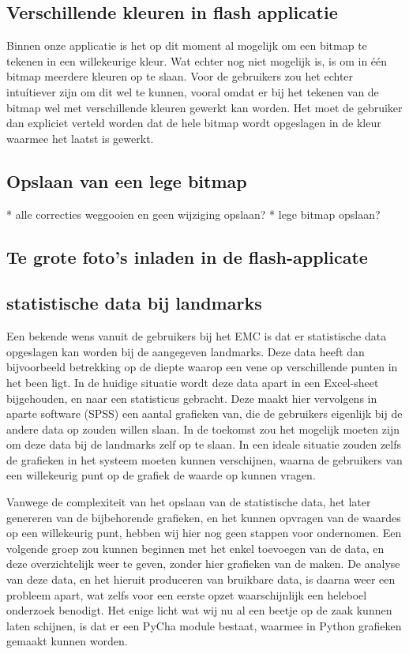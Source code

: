 \subsection{Verschillende kleuren in flash applicatie}
Binnen onze applicatie is het op dit moment al mogelijk om een bitmap te tekenen in een willekeurige kleur. 
Wat echter nog niet mogelijk is, is om in \'{e}\'{e}n bitmap meerdere kleuren op te slaan.
Voor de gebruikers zou het echter intu\'{i}tiever zijn om dit wel te kunnen, vooral omdat er bij het tekenen van de bitmap wel met verschillende kleuren gewerkt kan worden.
Het moet de gebruiker dan expliciet verteld worden dat de hele bitmap wordt opgeslagen in de kleur waarmee het laatst is gewerkt.

\subsection{Opslaan van een lege bitmap}
* alle correcties weggooien en geen wijziging opslaan?
* lege bitmap opslaan?

\subsection{Te grote foto's inladen in de flash-applicate}

\subsection{statistische data bij landmarks}
Een bekende wens vanuit de gebruikers bij het EMC is dat er statistische data opgeslagen kan worden bij de aangegeven landmarks.
Deze data heeft dan bijvoorbeeld betrekking op de diepte waarop een vene op verschillende punten in het been ligt.
In de huidige situatie wordt deze data apart in een Excel-sheet bijgehouden, en naar een statisticus gebracht.
Deze maakt hier vervolgens in aparte software (SPSS) een aantal grafieken van, die de gebruikers eigenlijk bij de andere data op zouden willen slaan.
In de toekomst zou het mogelijk moeten zijn om deze data bij de landmarks zelf op te slaan.
In een ideale situatie zouden zelfs de grafieken in het systeem moeten kunnen verschijnen, waarna de gebruikers van een willekeurig punt op de grafiek de waarde op kunnen vragen.

Vanwege de complexiteit van het opslaan van de statistische data, het later genereren van de bijbehorende grafieken, en het kunnen opvragen van de waardes op een willekeurig punt, hebben wij hier nog geen stappen voor ondernomen.
Een volgende groep zou kunnen beginnen met het enkel toevoegen van de data, en deze overzichtelijk weer te geven, zonder hier grafieken van de maken.
De analyse van deze data, en het hieruit produceren van bruikbare data, is daarna weer een probleem apart, wat zelfs voor een eerste opzet waarschijnlijk een heleboel onderzoek benodigt.
Het enige licht wat wij nu al een beetje op de zaak kunnen laten schijnen, is dat er een PyCha module bestaat, waarmee in Python grafieken gemaakt kunnen worden.

